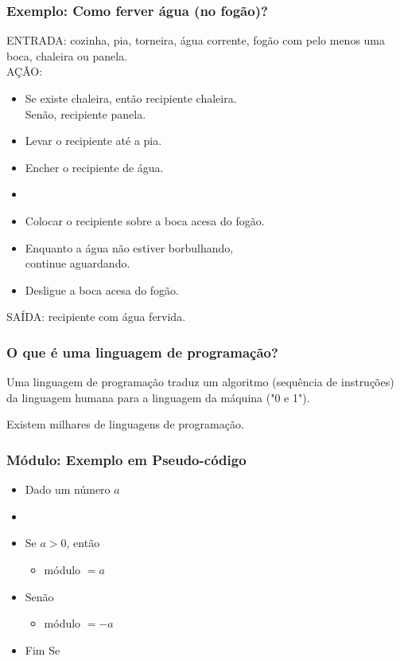 \documentclass[hyperref={pdfpagelabels=false}]{beamer}
\begin{document}
%
\begin{frame}
   \frametitle{Exemplo: Como ferver água (no fogão)?}
   ENTRADA: cozinha, pia, torneira, água corrente, fogão com pelo menos uma boca, chaleira ou panela.\\
   AÇÃO: 
   \begin{itemize}
      \item Se existe chaleira, então recipiente  chaleira. \\
				Senão, recipiente \only<2>{$\leftarrow$} panela.
      \item Levar o recipiente até a pia.
      \item Encher o recipiente de água.
      \item {}
      \item Colocar o recipiente sobre a boca acesa do fogão.
      \item Enquanto a água não estiver borbulhando, \\
				continue aguardando.
      \item Desligue a boca acesa do fogão.
   \end{itemize}
   SAÍDA: recipiente com água fervida.
\end{frame}
%
\begin{frame}
	\frametitle{O que é uma linguagem de programação?}
	Uma linguagem de programação traduz um algoritmo (sequência de instruções) da linguagem humana para a linguagem da máquina ("0 e 1").
	
	Existem milhares de linguagens de programação.
\end{frame}
%
\begin{frame}
   \frametitle{Módulo: Exemplo em Pseudo-código}
   \begin{center}
	\begin{itemize}
		\item[] Dado um número $a$
		\item[]
		\item[] Se $a > 0$, então
		\begin{itemize}
		   \item[] módulo $= a $
		\end{itemize}
		\item[] Senão
		\begin{itemize}
		   \item[] módulo $= -a$
		\end{itemize}
		\item[] Fim Se
	\end{itemize}
	\end{center}
\end{frame}
\end{document}
